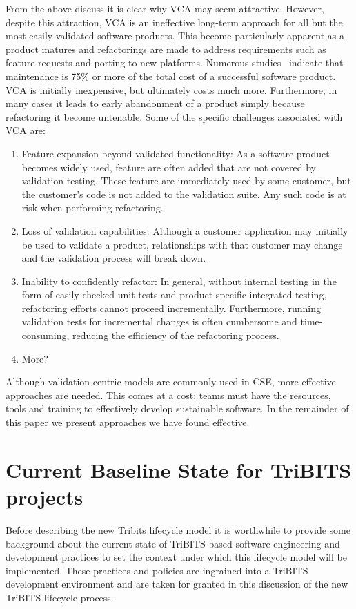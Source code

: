 \documentclass[11pt]{SANDreport}
\begin{document}
From the above discuss it is clear why VCA may seem attractive.  However, despite this attraction, VCA is an ineffective long-term approach for all but the most easily validated software products.  This become particularly apparent as a product matures and refactorings are made to address requirements such as feature requests and porting to new platforms.  Numerous studies~\cite{} indicate that maintenance is 75\% or more of the total cost of a successful software product.  VCA is initially inexpensive, but ultimately costs much more.  Furthermore, in many cases it leads to early abandonment of a product simply because refactoring it become untenable.  Some of the specific challenges associated with VCA are:
\begin{enumerate}
\item Feature expansion beyond validated functionality:  As a software product becomes widely used, feature are often added that are not covered by validation testing.  These feature are immediately used by some customer, but the customer's code is not added to the validation suite.  Any such code is at risk when performing refactoring.
\item Loss of validation capabilities:  Although a customer application may initially be used to validate a product, relationships with that customer may change and the validation process will break down.
\item Inability to confidently refactor:  In general, without internal testing in the form of easily checked unit tests and product-specific integrated testing, refactoring efforts cannot proceed incrementally.  Furthermore, running validation tests for incremental changes is often cumbersome and time-consuming, reducing the efficiency of the refactoring process.
\item More?
\end{enumerate}

Although validation-centric models are commonly used in CSE, more effective approaches are needed.  This comes at a cost: teams must have the resources, tools and training to effectively develop sustainable software.  In the remainder of this paper we present approaches we have found effective.

%
{}\section{Current Baseline State for TriBITS projects}
\label{sec:tribts_current_state}
%

Before describing the new Tribits lifecycle model it is worthwhile
to provide some background about the current state of TriBITS-based
software engineering and development practices to set the context
under which this lifecycle model will be implemented.  These
practices and policies are ingrained into a TriBITS development
environment and are taken for granted in this discussion of the new
TriBITS lifecycle process.
\end{document}
